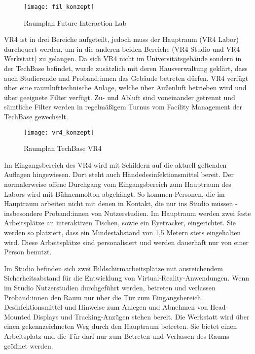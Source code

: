 \medskip
\begin{figure}[h]
    \label{fig:raumplan_fil}
    \centering
    \texttt{[image: fil\_konzept]}
    \caption{Raumplan Future Interaction Lab}
\end{figure}

\noindent
VR4 ist in drei Bereiche aufgeteilt, jedoch muss der Hauptraum (VR4 Labor) durchquert werden, um in die anderen beiden Bereiche (VR4 Studio und VR4 Werkstatt) zu gelangen. Da sich VR4 nicht im Universitätsgebäude sondern in der TechBase befindet, wurde zusätzlich mit deren Hausverwaltung geklärt, dass auch Studierende und Proband:innen das Gebäude betreten dürfen.
VR4 verfügt über eine raumlufttechnische Anlage, welche über Außenluft betrieben wird und über geeignete Filter verfügt.
Zu- und Abluft sind voneinander getrennt und sämtliche Filter werden in regelmäßigem Turnus vom Facility Management der TechBase gewechselt.

\medskip
\begin{figure}[h]
    \label{fig:raumplan_vr4}
    \centering
    \texttt{[image: vr4\_konzept]}
    \caption{Raumplan TechBase VR4}
\end{figure}

Im Eingangsbereich des VR4 wird mit Schildern auf die aktuell geltenden Auflagen hingewiesen.
Dort steht auch Händedesinfektionsmittel bereit.
Der normalerweise offene Durchgang vom Eingangsbereich zum Hauptraum des Labors wird mit Bühnenmolton abgehängt.
So kommen Personen, die im Hauptraum arbeiten nicht mit denen in Kontakt, die nur ins Studio müssen - insbesondere Proband:innen von Nutzerstudien.
Im Hauptraum werden zwei feste Arbeitsplätze an interaktiven Tischen, sowie ein Eyetracker, eingerichtet. Sie werden so platziert, dass ein Mindestabstand von 1,5 Metern stets eingehalten wird.
Diese Arbeitsplätze sind personalisiert und werden dauerhaft nur von einer Person benutzt.

Im Studio befinden sich zwei Bildschirmarbeitsplätze mit ausreichendem Sicherheitsabstand für die Entwicklung von Virtual-Reality-Anwendungen.
Wenn im Studio Nutzerstudien durchgeführt werden, betreten und verlassen Proband:innen den Raum nur über die Tür zum Eingangsbereich.
Desinfektionsmittel und Hinweise zum Anlegen und Abnehmen von Head-Mounted Displays und Tracking-Anzügen stehen bereit.
Die Werkstatt wird über einen gekennzeichneten Weg durch den Hauptraum betreten.
Sie bietet einen Arbeitsplatz und die Tür darf nur zum Betreten und Verlassen des Raums geöffnet werden.

